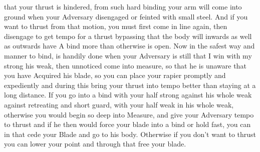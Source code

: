 \newpage


\newpage



that your thrust is hindered, from such hard binding your arm will
come into ground when your Adversary disengaged or feinted with
small steel. And if you want to thrust from that motion, you must
first come in line again, then disengage to get tempo for a thrust
bypassing that the body will inwards as well as outwards have A bind
more than otherwise is open. Now in the safest way and manner to
bind, is handily done when your Adversary is still that I win
with my strong his weak, then unnoticed come into measure, so that he
is unaware that you have Acquired his blade, so you can place your
rapier promptly and expediently and during this bring your thrust into
tempo better than staying at a long distance. If you go into a bind
with your half strong against his whole weak against retreating and short
guard, with your half weak in his whole weak, otherwise you would
begin so deep into Measure, and give your Adversary tempo to thrust
and if he then would force your blade into a bind or hold fast, you
can in that cede your Blade and go to his body. Otherwise if you don't
want to thrust you can lower your point and through that free your
blade.


